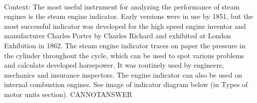 \documentclass[11pt,a4paper, onecolumn]{article}
\begin{document}
\\ Context: The most useful instrument for analyzing the performance of steam engines is the steam engine indicator. Early versions were in use by 1851, but the most successful indicator was developed for the high speed engine inventor and manufacturer Charles Porter by Charles Richard and exhibited at London Exhibition in 1862. The steam engine indicator traces on paper the pressure in the cylinder throughout the cycle, which can be used to spot various problems and calculate developed horsepower. It was routinely used by engineers, mechanics and insurance inspectors. The engine indicator can also be used on internal combustion engines. See image of indicator diagram below (in Types of motor units section). CANNOTANSWER
\end{document}
